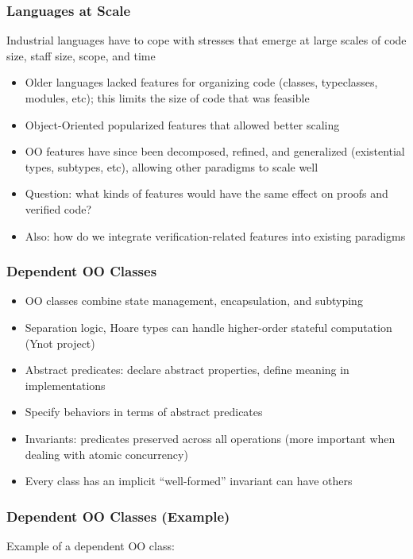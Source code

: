 \documentclass{beamer}
\begin{document}
\begin{frame}
  \frametitle{Languages at Scale}

  Industrial languages have to cope with stresses that emerge at large
  scales of code size, staff size, scope, and time
  \begin{itemize}
    \item Older languages lacked features for organizing code
      (classes, typeclasses, modules, etc); this limits the size of
      code that was feasible
    \item Object-Oriented popularized features that allowed better
      scaling
    \item OO features have since been decomposed, refined, and
      generalized (existential types, subtypes, etc), allowing other
      paradigms to scale well
    \item Question: what kinds of features would have the same effect
      on proofs and verified code?
    \item Also: how do we integrate verification-related features into
      existing paradigms
  \end{itemize}
\end{frame}

\begin{frame}
  \frametitle{Dependent OO Classes}
  \begin{itemize}
    \item OO classes combine state management, encapsulation, and subtyping
    \item Separation logic, Hoare types can handle higher-order
      stateful computation (Ynot project)
    \item Abstract predicates: declare abstract properties, define
      meaning in implementations
    \item Specify behaviors in terms of abstract predicates
    \item Invariants: predicates preserved across all operations (more
      important when dealing with atomic concurrency)
    \item Every class has an implicit ``well-formed'' invariant can
      have others
  \end{itemize}
\end{frame}

\begin{frame}
  \frametitle{Dependent OO Classes (Example)}
  Example of a dependent OO class:
  \lstset{language=java, basicstyle=\ttfamily\scriptsize}
  
\end{frame}
\end{document}

